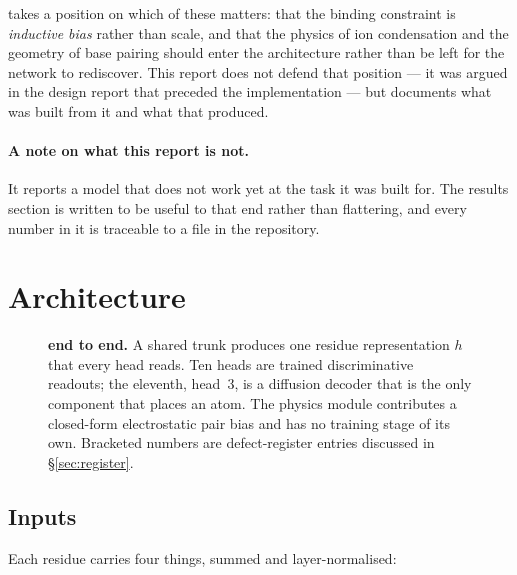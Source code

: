 \documentclass[11pt,a4paper]{article}
\begin{document}
\pharos{} takes a position on which of these matters: that the binding
constraint is \emph{inductive bias} rather than scale, and that the
physics of ion condensation and the geometry of base pairing should enter
the architecture rather than be left for the network to rediscover. This
report does not defend that position --- it was argued in the design
report that preceded the implementation --- but documents what was built
from it and what that produced.

\paragraph{A note on what this report is not.} It reports a model that
does not work yet at the task it was built for. The results section is
written to be useful to that end rather than flattering, and every number
in it is traceable to a file in the repository.

\section{Architecture}

\begin{figure}[H]\centering
\resizebox{\textwidth}{!}{}
\caption{\textbf{\pharos{} end to end.} A shared trunk produces one
residue representation $h$ that every head reads. Ten heads are trained
discriminative readouts; the eleventh, head~3, is a diffusion decoder
that is the only component that places an atom. The physics module
contributes a closed-form electrostatic pair bias and has no training
stage of its own. Bracketed numbers are defect-register entries
discussed in \S\ref{sec:register}.}
\label{fig:system}
\end{figure}

\subsection{Inputs}

Each residue carries four things, summed and layer-normalised:
\end{document}
